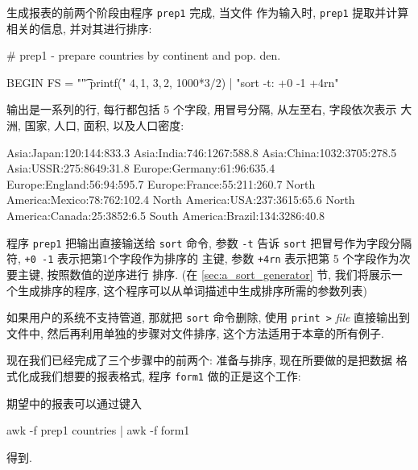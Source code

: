 生成报表的前两个阶段由程序 \verb'prep1' 完成, 当文件 
作为输入时, \verb'prep1' 提取并计算相关的信息, 并对其进行排序:
\begin{awkcode}
    # prep1 - prepare countries by continent and pop. den.

    BEGIN { FS = "\t" }
          { printf("%
                $4, $1, $3, $2, 1000*$3/$2) | "sort -t: +0 -1 +4rn"
          }
\end{awkcode}
输出是一系列的行, 每行都包括 5 个字段, 用冒号分隔, 从左至右, 字段依次表示
大洲, 国家, 人口, 面积, 以及人口密度:
\begin{awkcode}
    Asia:Japan:120:144:833.3
    Asia:India:746:1267:588.8
    Asia:China:1032:3705:278.5
    Asia:USSR:275:8649:31.8
    Europe:Germany:61:96:635.4
    Europe:England:56:94:595.7
    Europe:France:55:211:260.7
    North America:Mexico:78:762:102.4
    North America:USA:237:3615:65.6
    North America:Canada:25:3852:6.5
    South America:Brazil:134:3286:40.8
\end{awkcode}
程序 \verb'prep1' 把输出直接输送给 \verb'sort' 命令, 参数 \verb'-t' 告诉 
\verb'sort' 把冒号作为字段分隔符, \verb'+0 -1' 表示把第1个字段作为排序的
主键, 参数 \verb'+4rn' 表示把第 5 个字段作为次要主键, 按照数值的逆序进行
排序. (在 \ref{sec:a_sort_generator} 节, 我们将展示一个生成排序的程序,
这个程序可以从单词描述中生成排序所需的参数列表)

如果用户的系统不支持管道, 那就把 \verb'sort' 命令删除, 使用 \verb'print >'
\textit{file} 直接输出到文件中, 然后再利用单独的步骤对文件排序,
这个方法适用于本章的所有例子.

现在我们已经完成了三个步骤中的前两个: 准备与排序, 现在所要做的是把数据
格式化成我们想要的报表格式, 程序 \verb'form1' 做的正是这个工作:
期望中的报表可以通过键入
\begin{awkcode}
    awk -f prep1 countries | awk -f form1
\end{awkcode}
得到.

